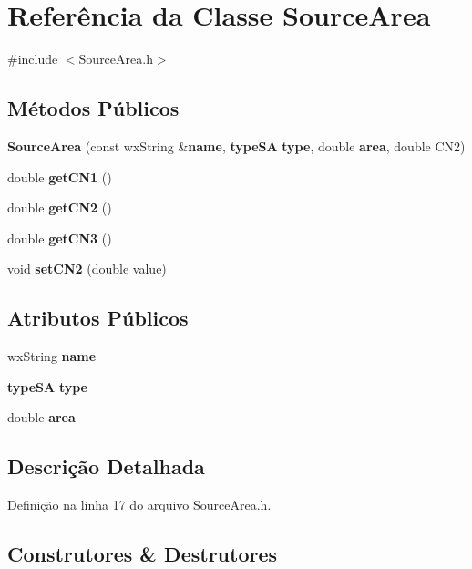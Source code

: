 \section{Referência da Classe Source\+Area}
\label{class_source_area}


{\ttfamily \#include $<$Source\+Area.\+h$>$}

\subsection*{Métodos Públicos}
\begin{DoxyCompactItemize}
\item 
{\bf Source\+Area} (const wx\+String \&{\bf name}, {\bf type\+SA} {\bf type}, double {\bf area}, double C\+N2)
\item 
double {\bf get\+C\+N1} ()
\item 
double {\bf get\+C\+N2} ()
\item 
double {\bf get\+C\+N3} ()
\item 
void {\bf set\+C\+N2} (double value)
\end{DoxyCompactItemize}
\subsection*{Atributos Públicos}
\begin{DoxyCompactItemize}
\item 
wx\+String {\bf name}
\item 
{\bf type\+SA} {\bf type}
\item 
double {\bf area}
\end{DoxyCompactItemize}


\subsection{Descrição Detalhada}


Definição na linha 17 do arquivo Source\+Area.\+h.



\subsection{Construtores \& Destrutores}
